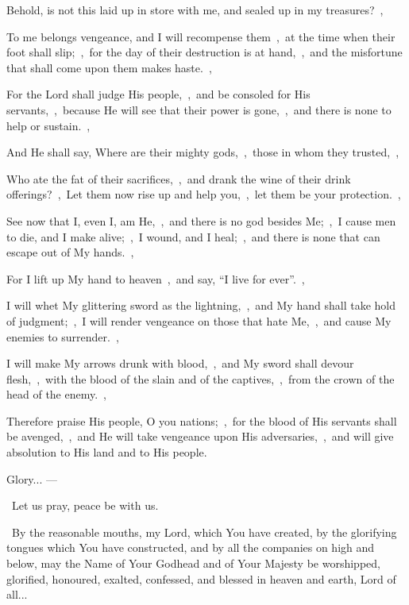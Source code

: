 \documentclass[12pt,twoside,a5paper]{article}
\begin{document}
\begin{halfparskip}
  Behold, is not this laid up in store with me, and sealed up in my treasures?~\sep

  To me belongs vengeance, and I will recompense them~\sep\ at the time when their foot shall slip;~\sep\ for the day of their destruction is at hand,~\sep\ and the misfortune that shall come upon them makes haste.~\sep

  For the Lord shall judge His people,~\sep\ and be consoled for His servants,~\sep\ because He will see that their power is gone,~\sep\ and there is none to help or sustain.~\sep

  And He shall say, Where are their mighty gods,~\sep\ those in whom they trusted,~\sep

  Who ate the fat of their sacrifices,~\sep\ and drank the wine of their drink offerings?~\sep\ Let them now rise up and help you,~\sep\ let them be your protection.~\sep

  See now that I, even I, am He,~\sep\ and there is no god besides Me;~\sep\ I cause men to die, and I make alive;~\sep\ I wound, and I heal;~\sep\ and there is none that can escape out of My hands.~\sep

  For I lift up My hand to heaven~\sep\ and say, ``I live for ever''.~\sep

  I will whet My glittering sword as the lightning,~\sep\ and My hand shall take hold of judgment;~\sep\ I will render vengeance on those that hate Me,~\sep\ and cause My enemies to surrender.~\sep

  I will make My arrows drunk with blood,~\sep\ and My sword shall devour flesh,~\sep\ with the blood of the slain and of the captives,~\sep\ from the crown of the head of the enemy.~\sep

  Therefore praise His people, O you nations;~\sep\ for the blood of His servants shall be avenged,~\sep\ and He will take vengeance upon His adversaries,~\sep\ and will give absolution to His land and to His people.
\end{halfparskip}


\begin{halfparskip}
  Glory... --- 
\end{halfparskip}

\dd~Let us pray, peace be with us.

\cc~By the reasonable mouths, my Lord, which You have created, by the glorifying tongues which You have constructed, and by all the companies on high and below, may the Name of Your Godhead and of Your Majesty be worshipped, glorified, honoured, exalted, confessed, and blessed in heaven and earth, Lord of all...
\end{document}
